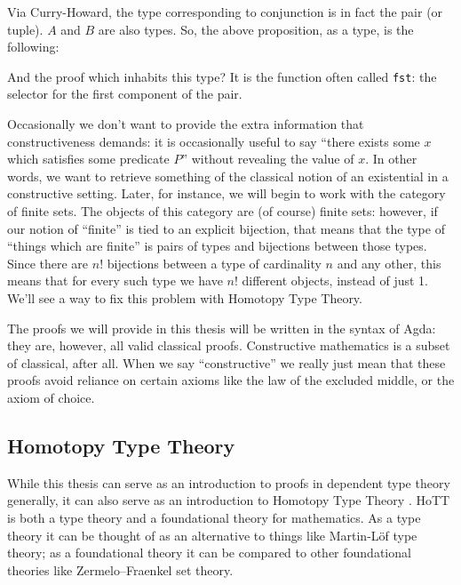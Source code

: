Via Curry-Howard, the type corresponding to conjunction is in fact the pair (or
tuple).
\(A\) and \(B\) are also types.
So, the above proposition, as a type, is the following:
\begin{agdalisting*}
   \vspace{-\baselineskip}
\end{agdalisting*}
And the proof which inhabits this type?
It is the function often called \verb+fst+: the selector for the first component
of the pair.
\begin{agdalisting*}
   \vspace{-\baselineskip}
\end{agdalisting*}

Occasionally we don't want to provide the extra information that
constructiveness demands: it is occasionally useful to say ``there exists some
\(x\) which satisfies some predicate \(P\)'' without revealing the value of \(x\).
In other words, we want to retrieve something of the classical notion of an
existential in a constructive setting.
Later, for instance, we will begin to work with the
category of finite sets.
The objects of this category are (of course) finite sets: however, if our notion
of ``finite'' is tied to an explicit bijection, that means that the type of
``things which are finite'' is pairs of types and bijections between those
types. 
Since there are \(n!\) bijections between a type of cardinality \(n\) and any
other, this means that for every such type we have \(n!\) different objects,
instead of just 1.
We'll see a way to fix this problem with Homotopy Type Theory.

The proofs we will provide in this thesis will be written in the syntax of
Agda: they are, however, all valid classical proofs.
Constructive mathematics is a subset of classical, after all.
When we say ``constructive'' we really just mean that these proofs avoid
reliance on certain axioms like the law of the excluded middle, or the axiom of
choice.
\subsection{Homotopy Type Theory}
While this thesis can serve as an introduction to proofs in dependent type
theory generally, it can also serve as an introduction to Homotopy Type Theory
\citep{hottbook}.
HoTT is both a type theory and a foundational theory for mathematics.
As a type theory it can be thought of as an alternative to things like
Martin-Löf type theory; as a foundational theory it can be compared to other
foundational theories like Zermelo–Fraenkel set theory.

